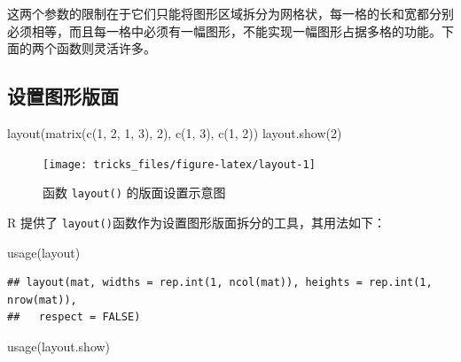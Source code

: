 \documentclass[
  b5paper,
  UTF8,twoside]{book}
\newenvironment{Shaded}{\begin{snugshade}}{\end{snugshade}}
\newcommand{\DecValTok}[1]{\textcolor[rgb]{0.00,0.00,0.81}{#1}}
\newcommand{\FunctionTok}[1]{\textcolor[rgb]{0.00,0.00,0.00}{#1}}
\newcommand{\NormalTok}[1]{#1}
\begin{document}
这两个参数的限制在于它们只能将图形区域拆分为网格状，每一格的长和宽都分别必须相等，而且每一格中必须有一幅图形，不能实现一幅图形占据多格的功能。下面的两个函数则灵活许多。

\hypertarget{ux8bbeux7f6eux56feux5f62ux7248ux9762}{%
\subsection{设置图形版面}\label{ux8bbeux7f6eux56feux5f62ux7248ux9762}}

\begin{Shaded}
\begin{Highlighting}[]
\FunctionTok{layout}\NormalTok{(}\FunctionTok{matrix}\NormalTok{(}\FunctionTok{c}\NormalTok{(}\DecValTok{1}\NormalTok{, }\DecValTok{2}\NormalTok{, }\DecValTok{1}\NormalTok{, }\DecValTok{3}\NormalTok{), }\DecValTok{2}\NormalTok{), }\FunctionTok{c}\NormalTok{(}\DecValTok{1}\NormalTok{, }\DecValTok{3}\NormalTok{), }\FunctionTok{c}\NormalTok{(}\DecValTok{1}\NormalTok{, }\DecValTok{2}\NormalTok{))}
\FunctionTok{layout.show}\NormalTok{(}\DecValTok{2}\NormalTok{)}
\end{Highlighting}
\end{Shaded}

\begin{figure}

{\centering \texttt{[image: tricks\_files/figure-latex/layout-1]} 

}

\caption{函数 \texttt{layout()} 的版面设置示意图}\label{fig:layout}
\end{figure}



R 提供了 \texttt{layout()}函数作为设置图形版面拆分的工具，其用法如下：

\begin{Shaded}
\begin{Highlighting}[]
\FunctionTok{usage}\NormalTok{(layout)}
\end{Highlighting}
\end{Shaded}

\begin{verbatim}
## layout(mat, widths = rep.int(1, ncol(mat)), heights = rep.int(1, nrow(mat)),
##   respect = FALSE)
\end{verbatim}

\begin{Shaded}
\begin{Highlighting}[]
\FunctionTok{usage}\NormalTok{(layout.show)}
\end{Highlighting}
\end{Shaded}
\end{document}
